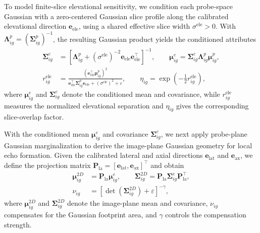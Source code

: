 To model finite-slice elevational sensitivity, we condition each probe-space
Gaussian with a zero-centered Gaussian slice profile along the calibrated
elevational direction $\mathbf e_{\mathrm{ele}}$, using a shared effective
slice width $\sigma^{\mathrm{ele}}>0$. With
$\boldsymbol\Lambda^{p}_{ig}
=
(\boldsymbol\Sigma^{p}_{ig})^{-1}$,
the resulting Gaussian product yields the conditioned attributes
\begin{equation}
\begin{aligned}
\boldsymbol\Sigma^{e}_{ig}
&=
\left[
\boldsymbol\Lambda^{p}_{ig}
+
\left(\sigma^{\mathrm{ele}}\right)^{-2}
\mathbf e_{\mathrm{ele}}
\mathbf e_{\mathrm{ele}}^\top
\right]^{-1},
\qquad
\boldsymbol\mu^{e}_{ig}
=
\boldsymbol\Sigma^{e}_{ig}
\boldsymbol\Lambda^{p}_{ig}
\boldsymbol\mu^{p}_{ig},
\\
r^{\mathrm{ele}}_{ig}
&=
\frac{
\left(
\mathbf e_{\mathrm{ele}}^\top
\boldsymbol\mu^{p}_{ig}
\right)^2
}{
\mathbf e_{\mathrm{ele}}^\top
\boldsymbol\Sigma^{p}_{ig}
\mathbf e_{\mathrm{ele}}
+
\left(\sigma^{\mathrm{ele}}\right)^2
+
\varepsilon
},
\qquad
\eta_{ig}
=
\exp
\left(
-\frac{1}{2}r^{\mathrm{ele}}_{ig}
\right),
\end{aligned}
\label{eq:elevational-conditioned-attributes}
\end{equation}
where $\boldsymbol\mu^{e}_{ig}$ and
$\boldsymbol\Sigma^{e}_{ig}$ denote the conditioned mean and covariance,
while $r^{\mathrm{ele}}_{ig}$ measures the normalized elevational separation
and $\eta_{ig}$ gives the corresponding slice-overlap factor.

With the conditioned mean $\boldsymbol\mu^{e}_{ig}$ and covariance
$\boldsymbol\Sigma^{e}_{ig}$, we next apply probe-plane Gaussian
marginalization to derive the image-plane Gaussian geometry for local echo
formation. Given the calibrated lateral and axial directions
$\mathbf e_{\mathrm{lat}}$ and $\mathbf e_{\mathrm{ax}}$, we define the
projection matrix
$\mathbf P_{\mathrm{la}}
=
[\mathbf e_{\mathrm{lat}},
\mathbf e_{\mathrm{ax}}]^\top$
and obtain
\begin{equation}
\begin{aligned}
\boldsymbol\mu^{2D}_{ig}
&=
\mathbf P_{\mathrm{la}}
\boldsymbol\mu^{e}_{ig},
\qquad
\boldsymbol\Sigma^{2D}_{ig}
=
\mathbf P_{\mathrm{la}}
\boldsymbol\Sigma^{e}_{ig}
\mathbf P_{\mathrm{la}}^\top,
\\
\nu_{ig}
&=
\left[
\det
\left(
\boldsymbol\Sigma^{2D}_{ig}
\right)
+
\varepsilon
\right]^{-\gamma},
\end{aligned}
\label{eq:local-image-attributes}
\end{equation}
where $\boldsymbol\mu^{2D}_{ig}$ and
$\boldsymbol\Sigma^{2D}_{ig}$ denote the image-plane mean and covariance,
$\nu_{ig}$ compensates for the Gaussian footprint area, and $\gamma$ controls
the compensation strength.

